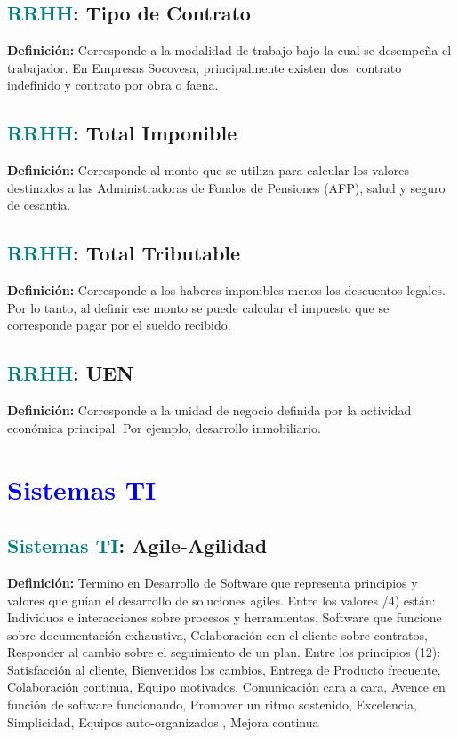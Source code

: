 \documentclass[12pt]{article}
\begin{document}
\subsection{\textcolor{teal}{RRHH}: Tipo de Contrato}
\textbf{Definición:} Corresponde a la modalidad de trabajo bajo la cual se desempeña el trabajador. En Empresas Socovesa, principalmente existen dos: contrato indefinido y contrato por obra o faena.
\subsection{\textcolor{teal}{RRHH}: Total Imponible}
\textbf{Definición:} Corresponde al monto que se utiliza para calcular los valores destinados a las Administradoras de Fondos de Pensiones (AFP), salud y seguro de cesantía.
\subsection{\textcolor{teal}{RRHH}: Total Tributable}
\textbf{Definición:} Corresponde a los haberes imponibles menos los descuentos legales. Por lo tanto, al definir ese monto se puede calcular el impuesto que se corresponde pagar por el sueldo recibido.
\subsection{\textcolor{teal}{RRHH}: UEN}
\textbf{Definición:} Corresponde a la unidad de negocio definida por la actividad económica principal. Por ejemplo, desarrollo inmobiliario.
\section{\textcolor{blue}{Sistemas TI}}
\subsection{\textcolor{teal}{Sistemas TI}: Agile-Agilidad}
\textbf{Definición:} Termino en Desarrollo de Software que representa principios y valores que guían el desarrollo de soluciones agiles. Entre los valores /4) están: Individuos e interacciones sobre procesos y herramientas, Software que funcione sobre documentación exhaustiva, Colaboración con el cliente sobre contratos, Responder al cambio sobre el seguimiento de un plan. Entre los principios (12): Satisfacción al cliente, Bienvenidos los cambios, Entrega de Producto frecuente, Colaboración continua, Equipo motivados, Comunicación cara a cara, Avence en función de software funcionando, Promover un ritmo sostenido, Excelencia, Simplicidad, Equipos auto-organizados , Mejora continua
\end{document}
